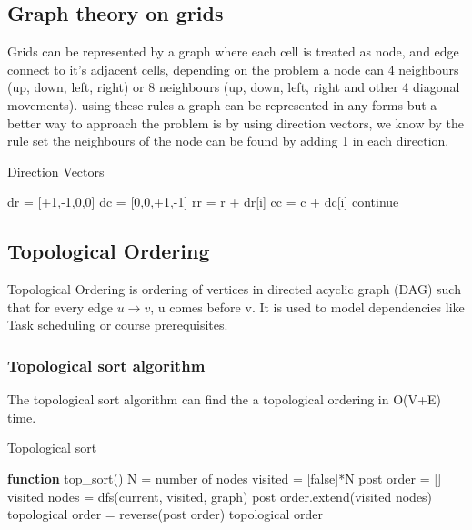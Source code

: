 \documentclass[12pt]{extarticle}
\begin{document}
\subsection{Graph theory on grids}
Grids can be represented by a graph where each cell is treated as node, and edge
connect to it's adjacent cells, depending on the problem a node can 4 neighbours 
(up, down, left, right) or 8 neighbours (up, down, left, right and other 4 diagonal
movements). using these rules a graph can be represented in any forms but a better 
way to approach the problem is by using direction vectors, we know by the rule set 
the neighbours of the node can be found by adding 1 in each direction. 

\begin{algorithm} [H]
    \caption{Direction Vectors}
    \begin{algorithmic}[1]
        \STATE dr = [+1,-1,0,0]
        \STATE dc = [0,0,+1,-1]
        \STATE rr = r + dr[i]
        \STATE cc = c + dc[i]
        \STATE continue
        \ENDIF
        \ENDFOR
    \end{algorithmic}
\end{algorithm}

\subsection{Topological Ordering}
Topological Ordering is ordering of vertices in directed acyclic graph (DAG) such that
for every edge $u \to v$, u comes before v. It is used to model dependencies like Task 
scheduling or course prerequisites.

\subsubsection*{Topological sort algorithm}
The topological sort algorithm can find the a topological ordering in O(V+E) time.

\begin{algorithm}[H]
    \caption{Topological sort}
    \begin{algorithmic}
    \STATE \textbf{function} top\_sort()
        \STATE N = number of nodes
        \STATE visited = [false]*N
        \STATE post order = []
        \STATE {}
        \STATE visited nodes = dfs(current, visited, graph) 
        \STATE post order.extend(visited nodes)
        \ENDIF
        \ENDFOR
        \STATE topological order = reverse(post order)
        \RETURN topological order
    \end{algorithmic}
\end{algorithm}
\end{document}
